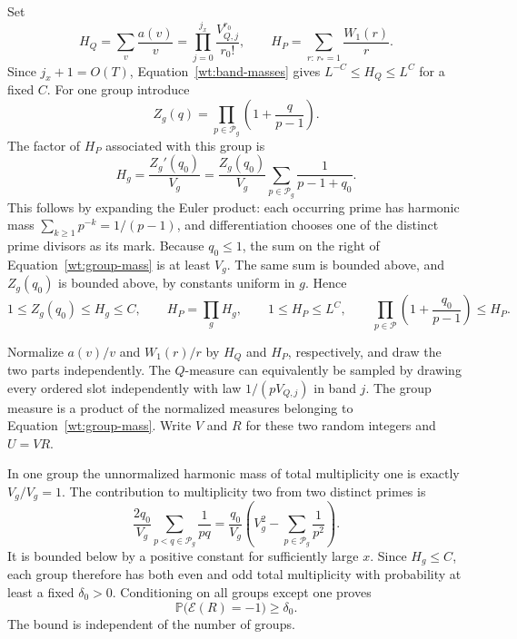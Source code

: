 Set
\begin{equation}\label{wt:harmonic-masses}
 H_Q=\sum_v\frac{a(v)}v
     =\prod_{j=0}^{j_x}\frac{V_{Q,j}^{r_0}}{r_0!},
 \qquad
 H_P=\sum_{r:\,r_*=1}\frac{W_1(r)}r.
\end{equation}
Since $j_x+1=O(T)$, Equation~\eqref{wt:band-masses} gives
$L^{-C}\le H_Q\le L^C$ for a fixed $C$.
For one group introduce
\[
 Z_g(q)=\prod_{p\in\mathcal P_g}\left(1+\frac q{p-1}\right).
\]
The factor of $H_P$ associated with this group is
\begin{equation}\label{wt:group-mass}
 H_g=\frac{Z_g'(q_0)}{V_g}
 =\frac{Z_g(q_0)}{V_g}
       \sum_{p\in\mathcal P_g}\frac1{p-1+q_0}.
\end{equation}
This follows by expanding the Euler product: each occurring prime has
harmonic mass $\sum_{k\ge1}p^{-k}=1/(p-1)$, and differentiation chooses
one of the distinct prime divisors as its mark. Because $q_0\le1$, the
sum on the right of Equation~\eqref{wt:group-mass} is at least $V_g$.
The same sum is bounded above, and $Z_g(q_0)$ is bounded above, by
constants uniform in $g$. Hence
\begin{equation}\label{wt:HP-bounds}
 1\le Z_g(q_0)\le H_g\le C,
 \qquad
 H_P=\prod_gH_g,\qquad 1\le H_P\le L^C,
 \qquad
 \prod_{p\in\mathcal P}\left(1+\frac{q_0}{p-1}\right)\le H_P.
\end{equation}

Normalize $a(v)/v$ and $W_1(r)/r$ by $H_Q$ and $H_P$, respectively,
and draw the two parts independently. The $Q$-measure can equivalently
be sampled by drawing every ordered slot independently with law
$1/(pV_{Q,j})$ in band $j$. The group measure is a product of the
normalized measures belonging to Equation~\eqref{wt:group-mass}.
Write $V$ and $R$ for these two random integers and $U=VR$.

In one group the unnormalized harmonic mass of total multiplicity one
is exactly $V_g/V_g=1$. The contribution to multiplicity two from
two distinct primes is
\[
 \frac{2q_0}{V_g}\sum_{p<q\in\mathcal P_g}\frac1{pq}
 =\frac{q_0}{V_g}
     \left(V_g^2-\sum_{p\in\mathcal P_g}\frac1{p^2}\right).
\]
It is bounded below by a positive constant for sufficiently large $x$.
Since $H_g\le C$, each group therefore has both even and odd total
multiplicity with probability at least a fixed $\delta_0>0$.
Conditioning on all groups except one proves
\begin{equation}\label{wt:odd-mass}
 \mathbb P\bigl(\mathcal E(R)=-1\bigr)\ge\delta_0.
\end{equation}
The bound is independent of the number of groups.

